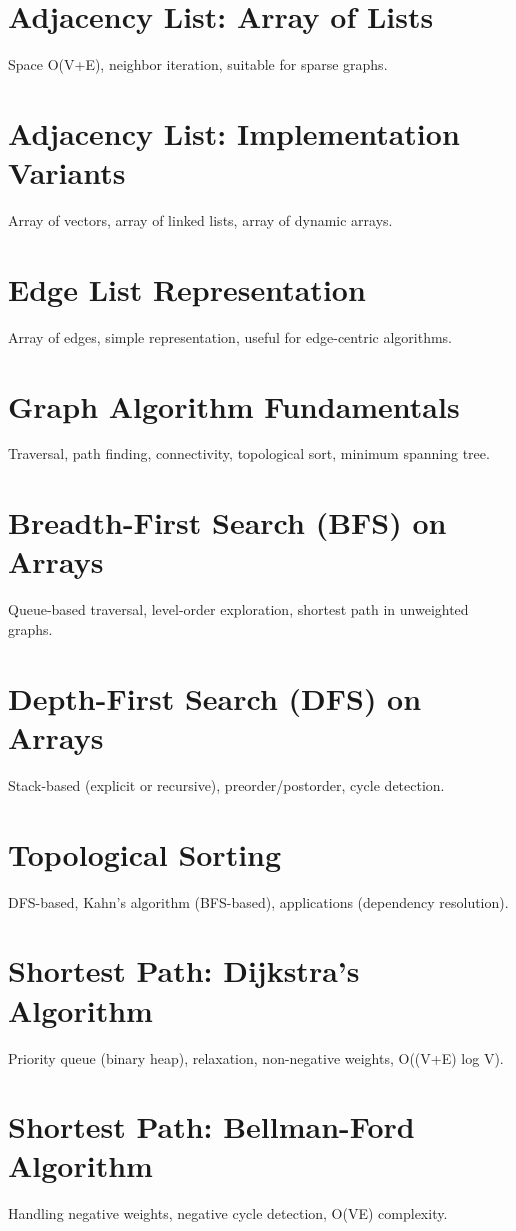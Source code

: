 \chapter{Adjacency List: Array of Lists}
Space O(V+E), neighbor iteration, suitable for sparse graphs.

\chapter{Adjacency List: Implementation Variants}
Array of vectors, array of linked lists, array of dynamic arrays.

\chapter{Edge List Representation}
Array of edges, simple representation, useful for edge-centric algorithms.

\chapter{Graph Algorithm Fundamentals}
Traversal, path finding, connectivity, topological sort, minimum spanning tree.

\chapter{Breadth-First Search (BFS) on Arrays}
Queue-based traversal, level-order exploration, shortest path in unweighted graphs.

\chapter{Depth-First Search (DFS) on Arrays}
Stack-based (explicit or recursive), preorder/postorder, cycle detection.

\chapter{Topological Sorting}
DFS-based, Kahn's algorithm (BFS-based), applications (dependency resolution).

\chapter{Shortest Path: Dijkstra's Algorithm}
Priority queue (binary heap), relaxation, non-negative weights, O((V+E) log V).

\chapter{Shortest Path: Bellman-Ford Algorithm}
Handling negative weights, negative cycle detection, O(VE) complexity.

